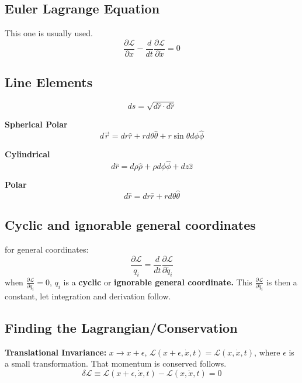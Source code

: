 \subsection{Euler Lagrange Equation}
This one is usually used.
\begin{equation}
	\label{//}
	\frac{\partial\mathcal{L}}{\partial x}-\frac{d}{dt}\frac{\partial\mathcal{L}}{\partial{\dot{x}}}=0
\end{equation}

\subsection{Line Elements}
\begin{equation}
	\label{}
	ds=\sqrt{d\hat{r}\cdot d\hat{r}}
\end{equation}

\textbf{Spherical Polar}
\begin{equation}
	\label{}
	d\vec{r}=dr\hat{r}+rd\theta\hat{\theta}+r\sin\theta d\phi\hat{\phi}	
\end{equation}

\textbf{Cylindrical}
\begin{equation}
	\label{}
	d\hat{r}=d\rho\hat{\rho}+\rho d\phi\hat{\phi}+dz\hat{z}
\end{equation}

\textbf{Polar}
\begin{equation}
	\label{}
	d\hat{r}=dr\hat{r}+rd\theta\hat{\theta}
\end{equation}
\subsection{Cyclic and ignorable general coordinates}
for general coordinates:
\begin{equation}
	\label{}
	\frac{\partial\mathcal{L}}{q_{i}}=\frac{d}{dt}\frac{\partial\mathcal{L}}{\partial\dot{q_{i}}}
\end{equation}
when $\frac{\partial\mathcal{L}}{\partial q_{i}}=0$, $q_{i}$ is a \textbf{cyclic} or \textbf{ignorable general coordinate.} This $\frac{\partial\mathcal{L}}{\partial \dot{q_{i}}}$ is then a constant, let integration and derivation follow.

\subsection{Finding the Lagrangian/Conservation}
\textbf{Translational Invariance: } $x\to x+\epsilon$, $\mathcal{L}(x+\epsilon,\dot{x},t)=\mathcal{L}(x,\dot{x},t)$, where $\epsilon$ is a small transformation. That momentum is conserved follows.
\begin{equation}
	\label{}
	\delta\mathcal{L}\equiv\mathcal{L}(x+\epsilon,\dot{x},t)-\mathcal{L}(x,\dot{x},t)=0
\end{equation}

